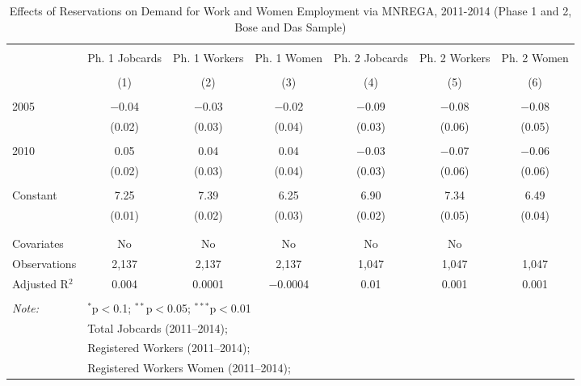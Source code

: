 
\begin{table}[!htbp] \centering 
  \caption{Effects of Reservations on Demand for Work and Women Employment via MNREGA, 2011-2014 (Phase 1 and 2, Bose and Das Sample)} 
  \label{mnrega_main_up} 
\scriptsize 
\begin{tabular}{@{\extracolsep{5pt}}lcccccc} 
\\[-1.8ex]\hline 
\hline \\[-1.8ex] 
 & Ph. 1 Jobcards & Ph. 1 Workers & Ph. 1 Women & Ph. 2 Jobcards & Ph. 2 Workers & Ph. 2 Women \\ 
\\[-1.8ex] & (1) & (2) & (3) & (4) & (5) & (6)\\ 
\hline \\[-1.8ex] 
 2005 & $-$0.04 & $-$0.03 & $-$0.02 & $-$0.09 & $-$0.08 & $-$0.08 \\ 
  & (0.02) & (0.03) & (0.04) & (0.03) & (0.06) & (0.05) \\ 
  & & & & & & \\ 
 2010 & 0.05 & 0.04 & 0.04 & $-$0.03 & $-$0.07 & $-$0.06 \\ 
  & (0.02) & (0.03) & (0.04) & (0.03) & (0.06) & (0.06) \\ 
  & & & & & & \\ 
 Constant & 7.25 & 7.39 & 6.25 & 6.90 & 7.34 & 6.49 \\ 
  & (0.01) & (0.02) & (0.03) & (0.02) & (0.05) & (0.04) \\ 
  & & & & & & \\ 
\hline \\[-1.8ex] 
Covariates & No & No & No & No & No &  \\ 
Observations & 2,137 & 2,137 & 2,137 & 1,047 & 1,047 & 1,047 \\ 
Adjusted R$^{2}$ & 0.004 & 0.0001 & $-$0.0004 & 0.01 & 0.001 & 0.001 \\ 
\hline 
\hline \\[-1.8ex] 
\textit{Note:}  & \multicolumn{6}{l}{$^{*}$p$<$0.1; $^{**}$p$<$0.05; $^{***}$p$<$0.01} \\ 
 & \multicolumn{6}{l}{Total Jobcards (2011--2014);} \\ 
 & \multicolumn{6}{l}{Registered Workers (2011--2014);} \\ 
 & \multicolumn{6}{l}{Registered Workers Women  (2011--2014);} \\ 
\end{tabular} 
\end{table} 
